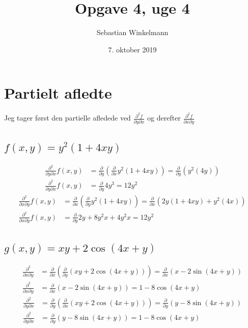 \documentclass{report}
\title{Opgave 4, uge 4}
\author{Sebastian Winkelmann}
\date{7. oktober 2019}
\begin{document}

\setcounter{chapter}{4}
\section{Partielt afledte}
Jeg tager først den partielle afledede ved $\frac{\partial^2f}{\partial y\partial x}$ og derefter $\frac{\partial^2f}{\partial x\partial y}$
\subsection{$f(x,y)=y^2(1+4xy)$}
\begin{align}
    \frac{\partial^2}{\partial y\partial x} f(x,y)&=\frac{\partial}{\partial y}\left(\frac{\partial}{\partial x}y^2(1+4xy)\right)=\frac{\partial}{\partial y}\left(y^2(4y)\right)\\
    \frac{\partial^2}{\partial y\partial x} f(x,y)&=\frac{\partial}{\partial y}4y^3=12y^2
\end{align}
\begin{align}
    \frac{\partial^2}{\partial x\partial y} f(x,y)&=\frac{\partial}{\partial x}\left(\frac{\partial}{\partial y}y^2(1+4xy)\right)=\frac{\partial}{\partial x}\left(2y(1+4xy)+y^2(4x)\right)\\
    \frac{\partial^2}{\partial x\partial y} f(x,y)&=\frac{\partial}{\partial y}2y+8y^2x+4y^2x=12y^2
\end{align}
\subsection{$g(x,y)=xy+2\cos{(4x+y)}$}
\begin{align}
    \frac{\partial^2}{\partial x\partial y}&=\frac{\partial}{\partial x}\left(\frac{\partial}{\partial y}\left(xy+2\cos{(4x+y)}\right)\right)= \frac{\partial}{\partial x}\left(x-2\sin{(4x+y)}\right)\\
    \frac{\partial^2}{\partial x\partial y}&=\frac{\partial}{\partial x}\left(x-2\sin{(4x+y)}\right)=1-8\cos{(4x+y)}
\end{align}
\begin{align}
    \frac{\partial^2}{\partial y\partial x}&=\frac{\partial}{\partial y}\left(\frac{\partial}{\partial x}\left(xy+2\cos{(4x+y)}\right)\right)= \frac{\partial}{\partial y}\left(y-8\sin{(4x+y)}\right)\\
    \frac{\partial^2}{\partial y\partial x}&=\frac{\partial}{\partial y}\left(y-8\sin{(4x+y)}\right)=1-8\cos{(4x+y)}
\end{align}{}
\end{document}

